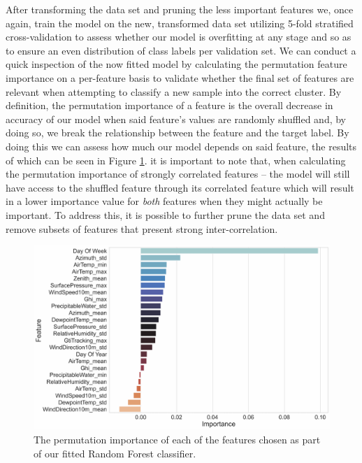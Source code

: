 \noindent \newline After transforming the data set and pruning the less important features we, once again, train the model on the new, transformed data set utilizing 5-fold stratified cross-validation to assess whether our model is overfitting at any stage and so as to ensure an even distribution of class labels per validation set. We can conduct a quick inspection of the now fitted model by calculating the permutation feature importance on a per-feature basis to validate whether the final set of features are relevant when attempting to classify a new sample into the correct cluster. By definition, the permutation importance of a feature is the overall decrease in accuracy of our model when said feature's values are randomly shuffled and, by doing so, we break the relationship between the feature and the target label. By doing this we can assess how much our model depends on said feature, the results of which can be seen in Figure \ref{fig:UCID-Classification-Permutation-Feature-Importance}. it is important to note that, when calculating the permutation importance of strongly correlated features -- the model will still have access to the shuffled feature through its correlated feature which will result in a lower importance value for \textit{both} features when they might actually be important. To address this, it is possible to further prune the data set and remove subsets of features that present strong inter-correlation.

\begin{figure}[H]
    \centering
    \includegraphics[width=\textwidth]{Images/Chapter 5/Stage 4/UCID/UCID-Classification-Permutation-Importance.pdf}
    \caption{The permutation importance of each of the features chosen as part of our fitted Random Forest classifier.}
    \label{fig:UCID-Classification-Permutation-Feature-Importance}
\end{figure}


